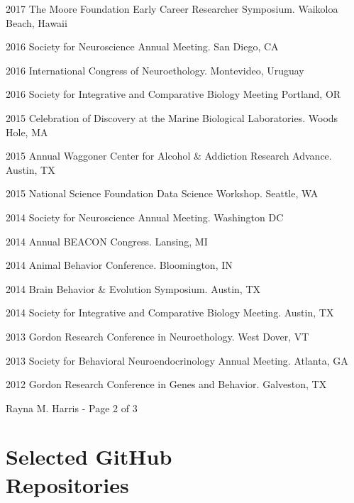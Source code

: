 \documentclass[margin,line]{resume}
\begin{document}
\begin{resume}
\begin{list1}

\item[]2017	The Moore Foundation Early Career Researcher Symposium. Waikoloa Beach, Hawaii
\item[]2016	Society for Neuroscience Annual Meeting. San Diego, CA
\item[]2016	International Congress of Neuroethology. Montevideo, Uruguay
\item[]2016 Society for Integrative and Comparative Biology Meeting Portland, OR
\item[]2015	Celebration of Discovery at the Marine Biological Laboratories. Woods Hole, MA
\item[]2015	Annual Waggoner Center for Alcohol \& Addiction Research Advance. Austin, TX
\item[]2015	National Science Foundation Data Science Workshop. Seattle, WA
\item[]2014	Society for Neuroscience Annual Meeting. Washington DC
\item[]2014	Annual BEACON Congress. Lansing, MI
\item[]2014	Animal Behavior Conference. Bloomington, IN
\item[]2014	Brain Behavior \& Evolution Symposium. Austin, TX
\item[]2014	Society for Integrative and Comparative Biology Meeting. Austin, TX
\item[]2013	Gordon Research Conference in Neuroethology. West Dover, VT
\item[]2013	Society for Behavioral Neuroendocrinology Annual Meeting. Atlanta, GA
\item[]2012	Gordon Research Conference in Genes and Behavior. Galveston, TX

\end{list1}


\vspace{0.6 cm}
{\centerline {Rayna M. Harris - Page 2 of 3}}
\newpage



\section{\mysidestyle Selected GitHub \\Repositories}


\end{resume}
\end{document}
